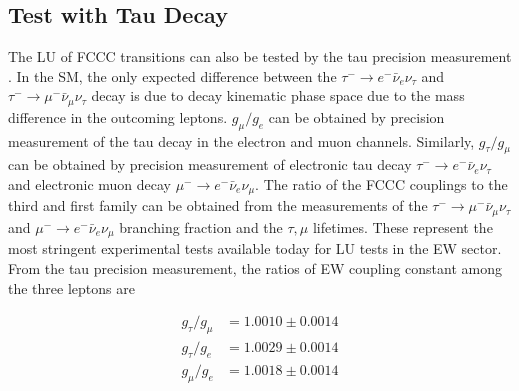 \subsection{Test with Tau Decay}
\label{sec:relatedWorks:lu:lepton}

The LU of FCCC transitions can also be tested by the tau precision measurement \cite{Pich:2013lsa}. In the SM, the only expected difference between the $\tau^- \to e^- \bar{\nu}_e \nu_\tau$  and $\tau^- \to \mu^- \bar{\nu}_\mu \nu_\tau$  decay is due to decay kinematic phase space due to the mass difference in the outcoming leptons. $g_\mu  / g_e $ can be obtained by precision measurement of the tau decay in the electron and muon channels. Similarly,  $g_\tau  / g_\mu $ can be obtained by precision measurement of electronic tau decay  $\tau^- \to e^- \bar{\nu}_e \nu_\tau$ and electronic muon decay  $\mu^- \to e^- \bar{\nu}_e \nu_\mu$.  The ratio of the FCCC couplings to the third and first family can be obtained from the measurements of the $\tau^- \to \mu^- \bar{\nu}_\mu \nu_\tau$  and $\mu^- \to e^- \bar{\nu}_e \nu_\mu$  branching fraction and the $\tau,\mu$ lifetimes.  These represent the most stringent experimental tests available today for LU tests in the EW sector. From the tau precision measurement, the ratios of EW coupling constant among the three leptons are \cite{Pich:2013lsa}

\begin{align}
    g_\tau / g_\mu &= 1.0010 \pm 0.0014 \\
    g_\tau / g_e   &= 1.0029 \pm 0.0014 \\
    g_\mu  / g_e   &= 1.0018 \pm 0.0014 
\end{align}


